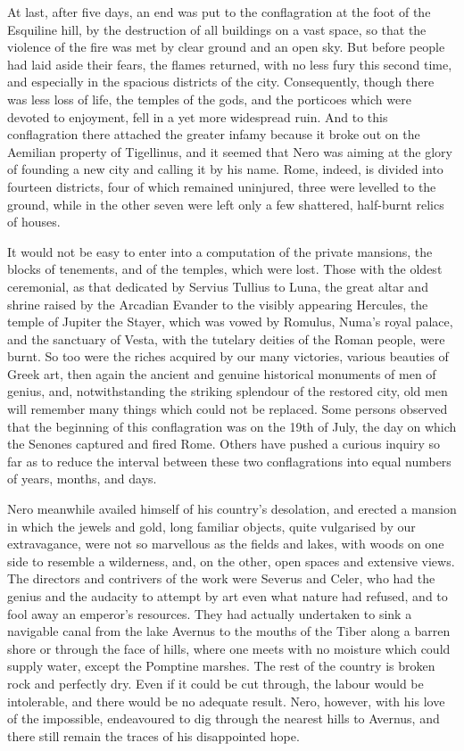 
At last, after five days, an end was put to the conflagration at the foot of the Esquiline hill, by the destruction of all buildings on a vast space, so that the violence of the fire was met by clear ground and an open sky. But before people had laid aside their fears, the flames returned, with no less fury this second time, and especially in the spacious districts of the city. Consequently, though there was less loss of life, the temples of the gods, and the porticoes which were devoted to enjoyment, fell in a yet more widespread ruin. And to this conflagration there attached the greater infamy because it broke out on the Aemilian property of Tigellinus, and it seemed that Nero was aiming at the glory of founding a new city and calling it by his name. Rome, indeed, is divided into fourteen districts, four of which remained uninjured, three were levelled to the ground, while in the other seven were left only a few shattered, half-burnt relics of houses.


It would not be easy to enter into a computation of the private mansions, the blocks of tenements, and of the temples, which were lost. Those with the oldest ceremonial, as that dedicated by Servius Tullius to Luna, the great altar and shrine raised by the Arcadian Evander to the visibly appearing Hercules, the temple of Jupiter the Stayer, which was vowed by Romulus, Numa's royal palace, and the sanctuary of Vesta, with the tutelary deities of the Roman people, were burnt. So too were the riches acquired by our many victories, various beauties of Greek art, then again the ancient and genuine historical monuments of men of genius, and, notwithstanding the striking splendour of the restored city, old men will remember many things which could not be replaced. Some persons observed that the beginning of this conflagration was on the 19th of July, the day on which the Senones captured and fired Rome. Others have pushed a curious inquiry so far as to reduce the interval between these two conflagrations into equal numbers of years, months, and days.


Nero meanwhile availed himself of his country's desolation, and erected a mansion in which the jewels and gold, long familiar objects, quite vulgarised by our extravagance, were not so marvellous as the fields and lakes, with woods on one side to resemble a wilderness, and, on the other, open spaces and extensive views. The directors and contrivers of the work were Severus and Celer, who had the genius and the audacity to attempt by art even what nature had refused, and to fool away an emperor's resources. They had actually undertaken to sink a navigable canal from the lake Avernus to the mouths of the Tiber along a barren shore or through the face of hills, where one meets with no moisture which could supply water, except the Pomptine marshes. The rest of the country is broken rock and perfectly dry. Even if it could be cut through, the labour would be intolerable, and there would be no adequate result. Nero, however, with his love of the impossible, endeavoured to dig through the nearest hills to Avernus, and there still remain the traces of his disappointed hope.

